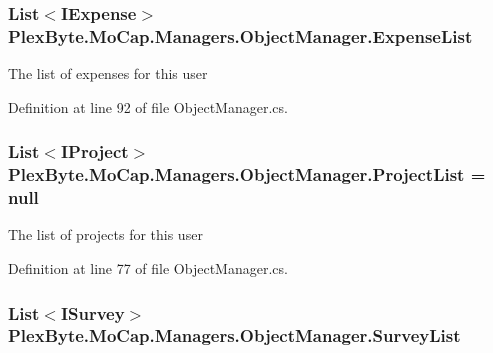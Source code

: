 \subsubsection[{\texorpdfstring{Expense\+List}{ExpenseList}}]{\setlength{\rightskip}{0pt plus 5cm}List$<$I\+Expense$>$ Plex\+Byte.\+Mo\+Cap.\+Managers.\+Object\+Manager.\+Expense\+List\hspace{0.3cm}{\ttfamily [get]}}\hypertarget{class_plex_byte_1_1_mo_cap_1_1_managers_1_1_object_manager_a47a98a677993d2028d756bb368ede9d9}{}\label{class_plex_byte_1_1_mo_cap_1_1_managers_1_1_object_manager_a47a98a677993d2028d756bb368ede9d9}


The list of expenses for this user 



Definition at line 92 of file Object\+Manager.\+cs.

\subsubsection[{\texorpdfstring{Project\+List}{ProjectList}}]{\setlength{\rightskip}{0pt plus 5cm}List$<$I\+Project$>$ Plex\+Byte.\+Mo\+Cap.\+Managers.\+Object\+Manager.\+Project\+List = null\hspace{0.3cm}{\ttfamily [get]}}\hypertarget{class_plex_byte_1_1_mo_cap_1_1_managers_1_1_object_manager_ae2a4180caef79d7316b897f09eecfdd1}{}\label{class_plex_byte_1_1_mo_cap_1_1_managers_1_1_object_manager_ae2a4180caef79d7316b897f09eecfdd1}


The list of projects for this user 



Definition at line 77 of file Object\+Manager.\+cs.

\subsubsection[{\texorpdfstring{Survey\+List}{SurveyList}}]{\setlength{\rightskip}{0pt plus 5cm}List$<$I\+Survey$>$ Plex\+Byte.\+Mo\+Cap.\+Managers.\+Object\+Manager.\+Survey\+List\hspace{0.3cm}{\ttfamily [get]}}\hypertarget{class_plex_byte_1_1_mo_cap_1_1_managers_1_1_object_manager_adb0e69918a06be755e9f8e18c8739a7c}{}\label{class_plex_byte_1_1_mo_cap_1_1_managers_1_1_object_manager_adb0e69918a06be755e9f8e18c8739a7c}



